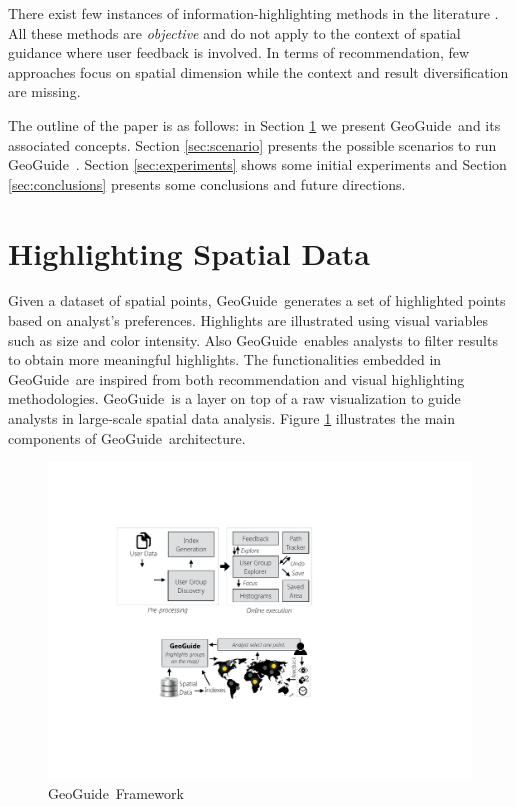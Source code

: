 \documentclass[conference,compsoc]{IEEEtran}
\newcommand{\framework}{{\sc GeoGuide}}
\begin{document}
There exist few instances of information-highlighting methods in the literature \cite{Liang2010,Robinson2011,wongsuphasawat2016voyager,willett2007scented}. All these methods are {\em objective} and do not apply to the context of spatial guidance where user feedback is involved.  In terms of recommendation, few approaches focus on spatial dimension \cite{Bao2015,Levandoski:2012} while the context and result diversification are missing.

The outline of the paper is as follows: in Section \ref{sec:pb}  we present \framework\, and its associated concepts. Section \ref{sec:scenario}  presents the possible scenarios to run \framework\ . Section  \ref{sec:experiments}  shows some initial experiments and Section \ref{sec:conclusions}  presents some conclusions and future directions. 


\section{Highlighting Spatial Data}
\label{sec:pb}

Given a dataset of spatial points, \framework\ generates a set of highlighted points based on analyst's preferences. Highlights are illustrated using visual variables such as size and color intensity. Also \framework\ enables analysts to filter results to obtain more meaningful highlights. The functionalities embedded in \framework\ are inspired from both recommendation \cite{Omidvar-Tehrani:2015} and visual highlighting \cite{Liang2010,Robinson2011} methodologies. \framework\ is a layer on top of a raw visualization to guide analysts in large-scale spatial data analysis. Figure \ref{fig:framework} illustrates the main components of \framework\ architecture.

\begin{figure}[t]
  \centering
  \includegraphics[width=\columnwidth]{figs/framework}
\caption{\framework\ Framework}
\label{fig:framework}
\vspace{-10pt}
\end{figure}
\end{document}
